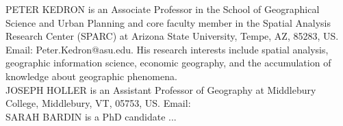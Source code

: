 \documentclass[]{interact}
\theoremstyle{plain}%
\theoremstyle{definition}
\theoremstyle{remark}
\begin{document}
\newpage


\newpage
\noindent PETER KEDRON is an Associate Professor in the School of Geographical Science and Urban Planning and core faculty member in the Spatial Analysis Research Center (SPARC) at Arizona State University, Tempe, AZ, 85283, US. Email: Peter.Kedron@asu.edu. His research interests include spatial analysis, geographic information science, economic geography, and the accumulation of knowledge about geographic phenomena. \\  
  
\noindent JOSEPH HOLLER is an Assistant Professor of Geography at Middlebury College, Middlebury, VT, 05753, US. Email: \\
  
\noindent SARAH BARDIN is a PhD candidate ...
\end{document}
